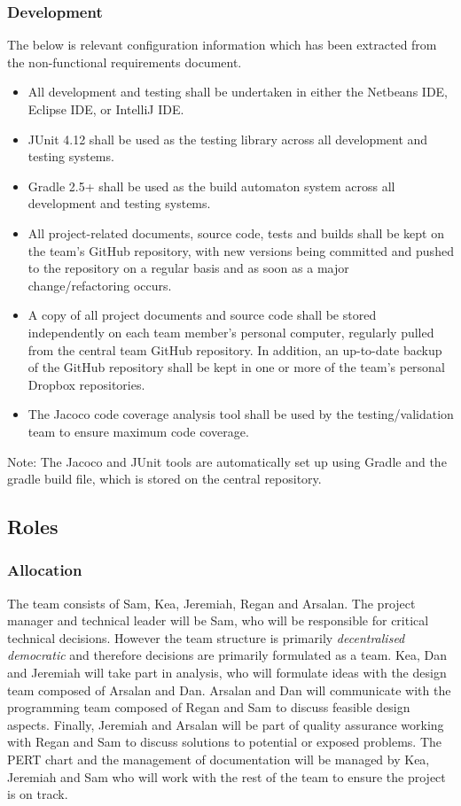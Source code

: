 \documentclass[11pt]{article}
\begin{document}
\subsubsection{Development}

The below is relevant configuration information which has been extracted from the non-functional requirements document.

\begin{itemize}
\item All development and testing shall be undertaken in either the Netbeans IDE, Eclipse IDE, or IntelliJ IDE.
\item JUnit 4.12 shall be used as the testing library across all development and testing systems.
\item Gradle 2.5+ shall be used as the build automaton system across all development and testing systems.
\item All project-related documents, source code, tests and builds shall be kept on the team’s GitHub repository, with new versions being committed and pushed to the repository on a regular basis and as soon as a major change/refactoring occurs.
\item A copy of all project documents and source code shall be stored independently on each team member’s personal computer, regularly pulled from the central team GitHub repository. In addition, an up-to-date backup of the GitHub repository shall be kept in one or more of the team’s personal Dropbox repositories.
\item The Jacoco code coverage analysis tool shall be used by the testing/validation team to ensure maximum code coverage.
\end{itemize}

Note: The Jacoco and JUnit tools are automatically set up using Gradle and the gradle build file, which is stored
on the central repository.

\subsection{Roles}

\subsubsection{Allocation}

The team consists of Sam, Kea, Jeremiah, Regan and Arsalan. The project manager and technical leader will be Sam, who will be responsible for critical technical decisions. However the team structure is primarily \textit{decentralised democratic} and therefore decisions are primarily formulated as a team. Kea, Dan and Jeremiah will take part in analysis, who will formulate ideas with the design team composed of Arsalan and Dan. Arsalan and Dan will communicate with the programming team composed of Regan and Sam to discuss feasible design aspects. Finally, Jeremiah and Arsalan will be part of quality assurance working with Regan and Sam to discuss solutions to potential or exposed problems. The PERT chart and the management of documentation will be managed by Kea, Jeremiah and Sam who will work with the rest of the team to ensure the project is on track.
\end{document}
